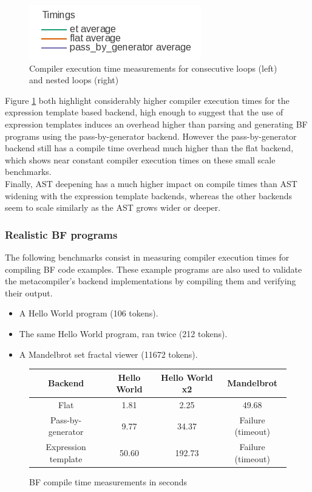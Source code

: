\documentclass[../main]{subfiles}
\begin{document}
\begin{figure}
\includegraphics[scale=0.5]{images/bf-graph-legend.png}
\caption{
  Compiler execution time measurements for consecutive loops (left) and nested loops (right)
}\label{fig:bf-bench}
\end{figure}

Figure \ref{fig:bf-bench}
both highlight considerably higher compiler execution times for the expression
template based backend, high enough to suggest that the use of expression
templates induces an overhead higher than parsing and generating BF programs
using the pass-by-generator backend. However the pass-by-generator backend still
has a compile time overhead much higher than the flat backend, which shows near
constant compiler execution times on these small scale benchmarks.\\

Finally, AST deepening has a much higher impact on compile times than AST
widening with the expression template backends, whereas the other backends seem
to scale similarly as the AST grows wider or deeper.

\subsubsection{Realistic BF programs}

The following benchmarks consist in measuring compiler execution times for
compiling BF code examples. These example programs are also used to validate the
metacompiler's backend implementations by compiling them and verifying their
output.

\begin{itemize}
\item A Hello World program (106 tokens).
\item The same Hello World program, ran twice (212 tokens).
\item A Mandelbrot set fractal viewer (11672 tokens).
\end{itemize}

\begin{figure}
\begin{tabular}{|c|c|c|c|}
\hline
Backend             & Hello World & Hello World x2  & Mandelbrot \\
\hline
Flat                & 1.81        & 2.25            & 49.68 \\
Pass-by-generator   & 9.77        & 34.37           & Failure (timeout) \\
Expression template & 50.60       & 192.73          & Failure (timeout) \\
\hline
\end{tabular}
\caption{BF compile time measurements in seconds
}\label{fig:BF-compile-times}
\end{figure}
\end{document}
